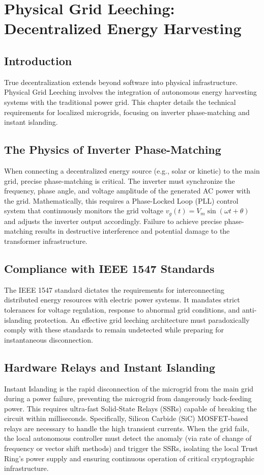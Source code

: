 \chapter{Physical Grid Leeching: Decentralized Energy Harvesting}

\section{Introduction}
True decentralization extends beyond software into physical infrastructure. Physical Grid Leeching involves the integration of autonomous energy harvesting systems with the traditional power grid. This chapter details the technical requirements for localized microgrids, focusing on inverter phase-matching and instant islanding.

\section{The Physics of Inverter Phase-Matching}
When connecting a decentralized energy source (e.g., solar or kinetic) to the main grid, precise phase-matching is critical. The inverter must synchronize the frequency, phase angle, and voltage amplitude of the generated AC power with the grid. Mathematically, this requires a Phase-Locked Loop (PLL) control system that continuously monitors the grid voltage $v_g(t) = V_m \sin(\omega t + \theta)$ and adjusts the inverter output accordingly. Failure to achieve precise phase-matching results in destructive interference and potential damage to the transformer infrastructure.

\section{Compliance with IEEE 1547 Standards}
The IEEE 1547 standard dictates the requirements for interconnecting distributed energy resources with electric power systems. It mandates strict tolerances for voltage regulation, response to abnormal grid conditions, and anti-islanding protection. An effective grid leeching architecture must paradoxically comply with these standards to remain undetected while preparing for instantaneous disconnection.

\section{Hardware Relays and Instant Islanding}
Instant Islanding is the rapid disconnection of the microgrid from the main grid during a power failure, preventing the microgrid from dangerously back-feeding power. This requires ultra-fast Solid-State Relays (SSRs) capable of breaking the circuit within milliseconds. Specifically, Silicon Carbide (SiC) MOSFET-based relays are necessary to handle the high transient currents. When the grid fails, the local autonomous controller must detect the anomaly (via rate of change of frequency or vector shift methods) and trigger the SSRs, isolating the local Trust Ring's power supply and ensuring continuous operation of critical cryptographic infrastructure.
